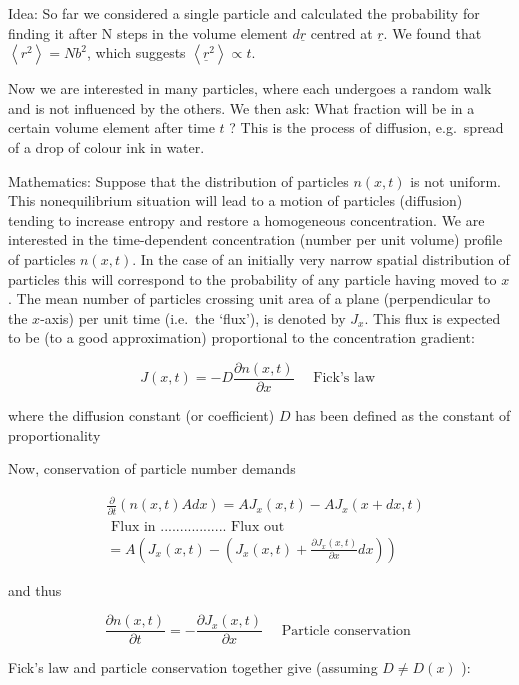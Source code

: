 \documentclass[
  letterpaper,
  DIV=11,
  numbers=noendperiod]{scrartcl}
\begin{document}
Idea: So far we considered a single particle and calculated the
probability for finding it after N steps in the volume element
\(d \underline{r}\) centred at \(\underline{r}\). We found that
\(\left\langle r^{2}\right\rangle=N b^{2}\), which suggests
\(\left\langle\underline{r}^{2}\right\rangle \propto t\).

Now we are interested in many particles, where each undergoes a random
walk and is not influenced by the others. We then ask: What fraction
will be in a certain volume element after time \(t\) ? This is the
process of diffusion, e.g.~spread of a drop of colour ink in water.

Mathematics: Suppose that the distribution of particles \(n(x, t)\) is
not uniform. This nonequilibrium situation will lead to a motion of
particles (diffusion) tending to increase entropy and restore a
homogeneous concentration. We are interested in the time-dependent
concentration (number per unit volume) profile of particles \(n(x, t)\).
In the case of an initially very narrow spatial distribution of
particles this will correspond to the probability of any particle having
moved to \(x\). The mean number of particles crossing unit area of a
plane (perpendicular to the \(x\)-axis) per unit time (i.e.~the `flux'),
is denoted by \(J_{x}\). This flux is expected to be (to a good
approximation) proportional to the concentration gradient:

\[
J(x, t)=-D \frac{\partial n(x, t)}{\partial x} \quad \text { Fick's law }
\]

where the diffusion constant (or coefficient) \(D\) has been defined as
the constant of proportionality

Now, conservation of particle number demands

\[
\begin{aligned}
& \frac{\partial}{\partial t}(n(x, t) A d x)=A J_{x}(x, t)-A J_{x}(x+d x, t) \\
& \text { Flux in ................. Flux out } \\
& =A\left(J_{x}(x, t)-\left(J_{x}(x, t)+\frac{\partial J_{x}(x, t)}{\partial x} d x\right)\right)
\end{aligned}
\]

and thus

\[
\frac{\partial n(x, t)}{\partial t}=-\frac{\partial J_{x}(x, t)}{\partial x} \quad \text { Particle conservation }
\]

Fick's law and particle conservation together give (assuming
\(D \neq D(x)\) ):
\end{document}

